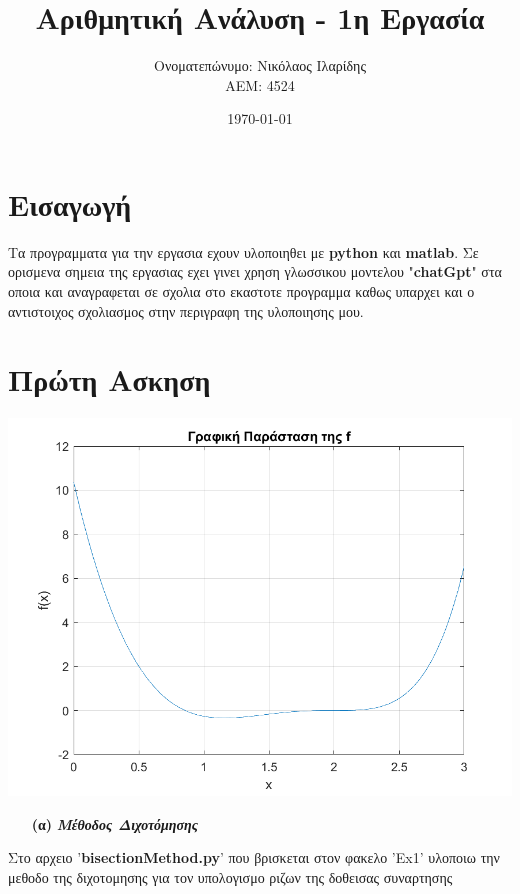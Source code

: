 \documentclass[a4paper,11pt]{article}
\title{Αριθμητική Ανάλυση - 1η Εργασία}
\author{Ονοματεπώνυμο: Νικόλαος Ιλαρίδης \\ ΑΕΜ: 4524}
\date{\today}
\begin{document}
	\maketitle
	
	\section{Εισαγωγή}
	\begin{center}
		Τα προγραμματα για την εργασια εχουν υλοποιηθει με \textbf{python} και \textbf{matlab}. Σε ορισμενα σημεια της εργασιας εχει γινει χρηση γλωσσικου μοντελου "\textbf{chatGpt}" στα οποια και αναγραφεται σε σχολια στο εκαστοτε προγραμμα καθως υπαρχει και ο αντιστοιχος σχολιασμος στην περιγραφη της υλοποιησης μου.
	\end{center}
	\section{Πρώτη Ασκηση}
	\begin{center}
		\emph{\includegraphics[scale=0.75]{ex1_graph.png}}
	\end{center}
	
\vspace{5cm}	
	\begin{enumerate}
			\item[\textbf{(α)}] \emph {\textbf{Μέθοδος Διχοτόμησης}}
	\end{enumerate}
	

	\begin{center}
		Στο αρχειο '\textbf{bisectionMethod.py}' που βρισκεται στον φακελο 'Ex1' υλοποιω την μεθοδο της διχοτομησης για τον υπολογισμο ριζων της δοθεισας συναρτησης 
	\end{center}
	
\end{document}
